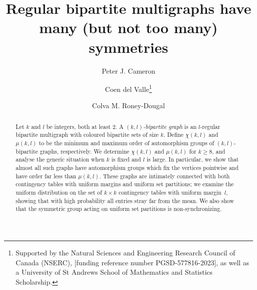 \documentclass{daj}
\theoremstyle{plain}
\theoremstyle{definition}
\begin{document}
\begin{frontmatter}[classification=text]

\title{Regular bipartite multigraphs have \\ many (but not too many) symmetries} %

\author[Cam]{Peter J. Cameron}
\author[del]{Coen del Valle\thanks{Supported by the Natural Sciences and Engineering Research Council of Canada (NSERC), [funding reference number PGSD-577816-2023], as well as a University of St Andrews School of Mathematics and Statistics Scholarship.}}
\author[Ron]{Colva M. Roney-Dougal}


\begin{abstract}
Let $k$ and $l$ be integers, both at least 2. A \emph{$(k,l)$-bipartite graph} is an $l$-regular bipartite multigraph with coloured bipartite sets of size $k$. Define $\chi(k,l)$ and $\mu(k,l)$ to be the minimum and maximum order of automorphism groups of $(k,l)$-bipartite graphs, respectively. 
We determine $\chi(k,l)$ and $\mu(k,l)$ for $k\geq 8$, and analyse the generic situation when $k$ is fixed and $l$ is large. In particular, we show that almost all such graphs have automorphism groups which fix the vertices pointwise and have order far less than $\mu(k,l)$. These graphs are intimately connected with both contingency tables with uniform margins and uniform set partitions; 
we examine the uniform distribution on the set of $k\times k$ contingency tables with uniform margin~$l$, showing that with high probability all entries stray far from the mean. We also show that the symmetric group acting on uniform set partitions is non-synchronizing.
\end{abstract}
\end{frontmatter}

\end{document}

